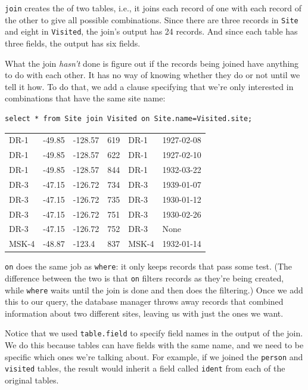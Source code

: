 \documentclass{book}
\begin{document}
\texttt{join} creates the  of
two tables, i.e., it joins each record of one with each record of the
other to give all possible combinations. Since there are three records
in \texttt{Site} and eight in \texttt{Visited}, the join's output has 24
records. And since each table has three fields, the output has six
fields.

What the join \emph{hasn't} done is figure out if the records being
joined have anything to do with each other. It has no way of knowing
whether they do or not until we tell it how. To do that, we add a clause
specifying that we're only interested in combinations that have the same
site name:

\begin{verbatim}
select * from Site join Visited on Site.name=Visited.site;
\end{verbatim}

\begin{tabular}{llllll}
DR-1 & -49.85 & -128.57 & 619 & DR-1 & 1927-02-08 \\
DR-1 & -49.85 & -128.57 & 622 & DR-1 & 1927-02-10 \\
DR-1 & -49.85 & -128.57 & 844 & DR-1 & 1932-03-22 \\
DR-3 & -47.15 & -126.72 & 734 & DR-3 & 1939-01-07 \\
DR-3 & -47.15 & -126.72 & 735 & DR-3 & 1930-01-12 \\
DR-3 & -47.15 & -126.72 & 751 & DR-3 & 1930-02-26 \\
DR-3 & -47.15 & -126.72 & 752 & DR-3 & None \\
MSK-4 & -48.87 & -123.4 & 837 & MSK-4 & 1932-01-14 \\
\end{tabular}

\texttt{on} does the same job as \texttt{where}: it only keeps records
that pass some test. (The difference between the two is that \texttt{on}
filters records as they're being created, while \texttt{where} waits
until the join is done and then does the filtering.) Once we add this to
our query, the database manager throws away records that combined
information about two different sites, leaving us with just the ones we
want.

Notice that we used \texttt{table.field} to specify field names in the
output of the join. We do this because tables can have fields with the
same name, and we need to be specific which ones we're talking about.
For example, if we joined the \texttt{person} and \texttt{visited}
tables, the result would inherit a field called \texttt{ident} from each
of the original tables.
\end{document}
